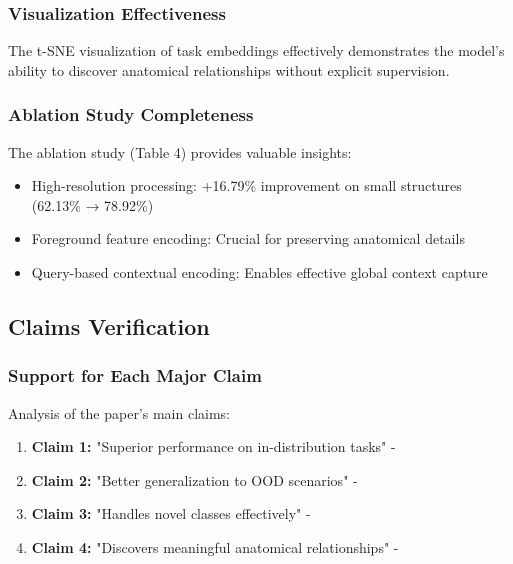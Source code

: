 \subsubsection{Visualization Effectiveness}
The t-SNE visualization of task embeddings effectively demonstrates the model's ability to discover anatomical relationships without explicit supervision. 

\subsubsection{Ablation Study Completeness}
The ablation study (Table 4) provides valuable insights:
\begin{itemize}
    \item High-resolution processing: +16.79\% improvement on small structures (62.13\% → 78.92\%)
    \item Foreground feature encoding: Crucial for preserving anatomical details
    \item Query-based contextual encoding: Enables effective global context capture
\end{itemize}

\subsection{Claims Verification}
\subsubsection{Support for Each Major Claim}
Analysis of the paper's main claims:
\begin{enumerate}
    \item \textbf{Claim 1:} "Superior performance on in-distribution tasks" - 
    \item \textbf{Claim 2:} "Better generalization to OOD scenarios" - 
    \item \textbf{Claim 3:} "Handles novel classes effectively" - 
    \item \textbf{Claim 4:} "Discovers meaningful anatomical relationships" - 
\end{enumerate}

